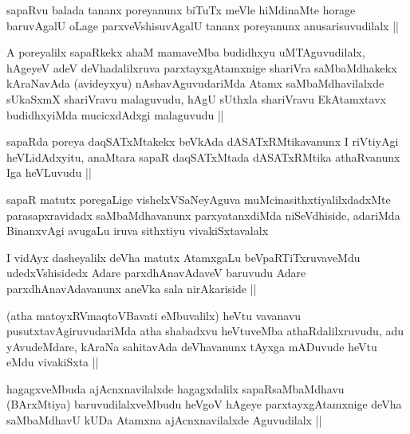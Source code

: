 \begin{artha}
sapaRvu balada tananx poreyanunx biTuTx meVle hiMdinaMte horage
baruvAgalU oLage parxveVshisuvAgalU tananx poreyanunx
anusarisuvudilalx ||
\end{artha}


\begin{artha}
A poreyalilx sapaRkekx ahaM mamaveMba budidhxyu uMTAguvudilalx,
hAgeyeV adeV deVhadalilxruva parxtayxgAtamxnige shariVra saMbaMdhakekx
kAraNavAda (avideyxyu) nAshavAguvudariMda Atamx saMbaMdhavilalxde
sUkaSxmX shariVravu malaguvudu, hAgU sUthxla shariVravu EkAtamxtavx
budidhxyiMda mucicxdAdxgi malaguvudu ||
\end{artha}

\begin{artha}
sapaRda poreya daqSATxMtakekx beVkAda dASATxRMtikavanunx I riVtiyAgi
heVLidAdxyitu, anaMtara sapaR daqSATxMtada dASATxRMtika athaRvanunx
Iga heVLuvudu ||
\end{artha}


\begin{artha}
sapaR matutx poregaLige vishelxVSaNeyAguva muMcinasithxtiyalilxdadxMte
parasapxravidadx saMbaMdhavanunx parxyatanxdiMda niSeVdhiside,
adariMda BinanxvAgi avugaLu iruva sithxtiyu vivakiSxtavalalx 
\end{artha}

\begin{artha}
I vidAyx dasheyalilx deVha matutx AtamxgaLu beVpaRTiTxruvaveMdu
udedxVshisidedx Adare parxdhAnavAdaveV baruvudu Adare
parxdhAnavAdavanunx aneVka sala nirAkariside ||
\end{artha}


\begin{artha}
(atha matoyxRV\s maqtoVBavati eMbuvalilx) heVtu vavanavu
  pusutxtavAgiruvudariMda atha shabadxvu heVtuveMba athaRdalilxruvudu,
  adu yAvudeMdare, kAraNa sahitavAda deVhavanunx tAyxga mADuvude heVtu
  eMdu vivakiSxta ||
\end{artha}

\begin{artha}
hagagxveMbuda ajAcnxnavilalxde hagagxdalilx sapaRsaMbaMdhavu
(BArxMtiya) baruvudilalxveMbudu heVgoV hAgeye parxtayxgAtamxnige deVha
saMbaMdhavU kUDa Atamxna ajAcnxnavilalxde Aguvudilalx ||
\end{artha}

